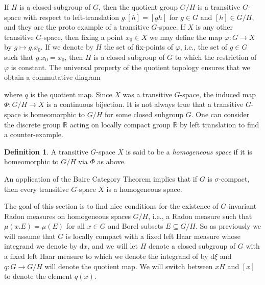 \documentclass[10pt,twoside,openany,final]{memoir}
\theoremstyle{definition}
\newtheorem{definition}[theorem]{Definition}
\theoremstyle{Break}
\newcommand{\R}{\mathbb{R}}
\renewcommand{\d}{\mathrm{d}}
\begin{document}
If $H$ is a closed subgroup of $G$, then the quotient group $G/H$ is a transitive $G$-space with respect to left-translation $g.[h]=[gh]$ for $g \in G$ and $[h] \in G/H$, and they are the proto example of a transitive $G$-space. If $X$ is any other transitive $G$-space, then fixing a point $x_0 \in X$ we may define the map $\varphi \colon G \to X$ by $g \mapsto g.x_0$. If we denote by $H$ the set of fix-points of $\varphi$, i.e., the set of $g \in G$ such that $g.x_0=x_0$, then $H$ is a closed subgroup of $G$ to which the restriction of $\varphi$ is constant. The universal property of the quotient topology ensures that we obtain a commutative diagram
\begin{center}
\end{center}
where $q$ is the quotient map. Since $X$ was a transitive $G$-space, the induced map $\Phi\colon G/H \to X$ is a continuous bijection. It is not always true that a transitive $G$-space is homeomorphic to $G/H$ for some closed subgroup $G$. One can consider the discrete group $\R$ acting on locally compact group $\R$ by left translation to find a counter-example. 
\begin{definition}
	A transitive $G$-space $X$ is said to be a \emph{homogeneous space} if it is homeomorphic to $G/H$ via $\Phi$ as above.
\end{definition}
An application of the Baire Category Theorem implies that if $G$ is $\sigma$-compact, then every transitive $G$-space $X$ is a homogeneous space.

The goal of this section is to find nice conditions for the existence of $G$-invariant Radon measures on homogeneous spaces $G/H$, i.e., a Radon measure such that $\mu(x.E)=\mu(E)$ for all $x \in G$ and Borel subsets $E \subseteq G/H$. So as previously we will assume that $G$ is locally compact with a fixed left Haar measure whose integrand we denote by $\d x$, and we will let $H$ denote a closed subgroup of $G$ with a fixed left Haar measure to which we denote the integrand of by $\d \xi$ and $q \colon G \to G/H$ will denote the quotient map. We will switch between $xH$ and $[x]$ to denote the element $q(x)$.
\end{document}
